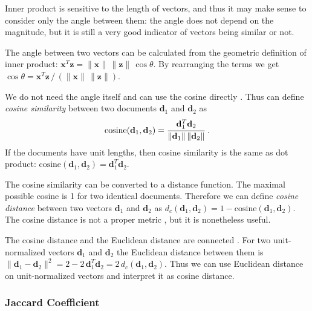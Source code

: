 

Inner product is sensitive to the length of vectors, and thus
it may make sense to consider only the angle between them:
the angle does not depend on the magnitude, but it is still
a very good indicator of vectors being similar or not.

The angle between two vectors can be calculated from the geometric
definition of inner product:
$\mathbf x^T \mathbf z = \|\mathbf x \| \, \| \mathbf z \| \, \cos \theta$.
By rearranging the terms we get
$\cos \theta = \mathbf x^T \mathbf z \, / \, (\|\mathbf x \| \, \| \mathbf z \|)$.

We do not need the angle itself and can use the cosine directly
\cite{manning2008introduction}.
Thus can define \emph{cosine similarity} between two documents $\mathbf d_1$ and
$\mathbf d_2$ as
$$\text{cosine}(\mathbf d_1, \mathbf d_2) = \cfrac{\mathbf d_1^T \mathbf d_2}{\|\mathbf d_1 \| \, \| \mathbf d_2 \|} \ .$$
If the documents have unit lengths, then cosine similarity is the same as
dot product: $\text{cosine}(\mathbf d_1, \mathbf d_2) = \mathbf d_1^T \mathbf d_2$.

The cosine similarity can be converted to a distance function.
The maximal possible cosine is 1 for two identical documents.
Therefore we can define \emph{cosine distance} between two vectors
$\mathbf d_1$ and $\mathbf d_2$ as
$d_c(\mathbf d_1, \mathbf d_2) = 1 - \text{cosine}(\mathbf d_1, \mathbf d_2)$.
The cosine distance is not a proper metric \cite{korenius2007principal},
but it is nonetheless useful.

The cosine distance and the Euclidean distance are connected \cite{korenius2007principal}.
For two unit-normalized vectors $\mathbf d_1$ and $\mathbf d_2$ the Euclidean distance
between them is $\| \mathbf d_1 - \mathbf d_2 \|^2 = 2 - 2 \, \mathbf d_1^T \mathbf d_2 =2 \, d_c(\mathbf d_1, \mathbf d_2)$. Thus we can use Euclidean distance on
unit-normalized vectors and interpret it as cosine distance.


\subsubsection{Jaccard Coefficient} \ \\


